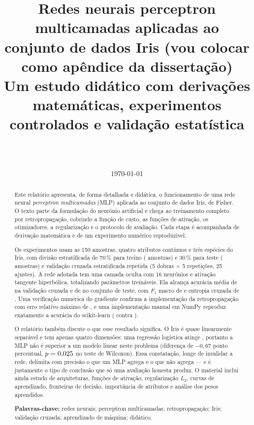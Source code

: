 \documentclass[12pt,a4paper]{article}
\title{\textbf{Redes neurais perceptron multicamadas aplicadas ao conjunto de dados Iris (vou colocar como apêndice da dissertação)}\\[2mm]
	\large Um estudo didático com derivações matemáticas, experimentos controlados e validação estatística }
\author{\completar{Nome do autor} \\ \completar{Instituição} \\ \texttt{\completar{email}}}
\date{\today}
\theoremstyle{definition}
\theoremstyle{plain}
\theoremstyle{remark}
\begin{document}
\maketitle

\begin{abstract}
\noindent
Este relatório apresenta, de forma detalhada e didática, o funcionamento de uma rede neural
\emph{perceptron multicamadas} (MLP) aplicada ao conjunto de dados Iris, de Fisher. O texto parte
da formulação do neurônio artificial e chega ao treinamento completo por retropropagação, cobrindo
a função de custo, as funções de ativação, os otimizadores, a regularização e o protocolo de
avaliação. Cada etapa é acompanhada de derivação matemática e de um experimento numérico
reproduzível.

Os experimentos usam as 150 amostras, quatro atributos contínuos e três espécies do Iris, com
divisão estratificada de 70\,\% para treino (\nTreino{} amostras) e 30\,\% para teste
(\nTeste{} amostras) e validação cruzada estratificada repetida (5 dobras $\times$ 5 repetições,
25 ajustes). A rede adotada tem uma camada oculta com 16 neurônios e ativação tangente hiperbólica,
totalizando \parametrosMLP{} parâmetros treináveis. Ela alcança acurácia média de \accMLP{} na
validação cruzada e de \accTeste{} no conjunto de teste, com $F_1$ macro de \fmacroTeste{} e entropia
cruzada de \llteste{}. Uma verificação numérica do gradiente confirma a implementação da
retropropagação com erro relativo máximo de \erroGrad{}, e uma implementação manual em NumPy
reproduz exatamente a acurácia do scikit-learn (\accNumpy{} contra \accSklearn{}).

O relatório também discute o que esse resultado significa. O Iris é quase linearmente separável e
tem apenas quatro dimensões: uma regressão logística atinge \accLR{}, portanto a MLP não é
superior a um modelo linear neste problema (diferença de $-0{,}67$ ponto percentual,
$p=0{,}025$ no teste de Wilcoxon). Essa constatação, longe de invalidar a rede, delimita com precisão
o que um MLP agrega e o que não agrega --- e é justamente o tipo de conclusão que só uma avaliação
honesta produz. O material inclui ainda estudo de arquiteturas, funções de ativação, regularização
$L_2$, curvas de aprendizado, fronteiras de decisão, importância de atributos e análise dos pesos
aprendidos.

\vspace{2mm}
\noindent\textbf{Palavras-chave:} redes neurais; perceptron multicamadas; retropropagação; Iris;
validação cruzada; aprendizado de máquina; didático.
\end{abstract}
\end{document}
